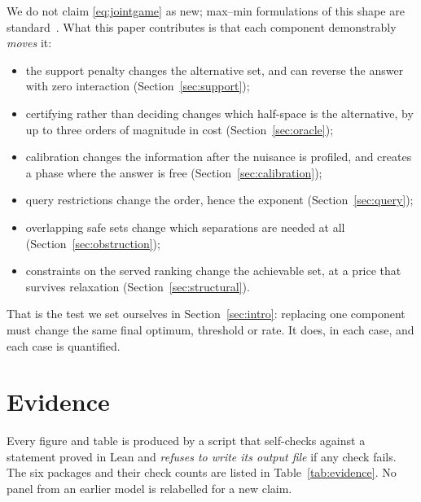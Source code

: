 We do not claim \eqref{eq:jointgame} as new; max--min formulations of this shape are
standard~\cite{degenne2019,nitinawarat2013}. What this paper contributes is that each
component demonstrably \emph{moves} it:
\begin{itemize}
\item the support penalty changes the alternative set, and can reverse the answer with zero
interaction (Section~\ref{sec:support});
\item certifying rather than deciding changes which half-space is the
alternative, by up to three orders of magnitude in cost (Section~\ref{sec:oracle});
\item calibration changes the information after the nuisance is profiled, and creates a
phase where the answer is free (Section~\ref{sec:calibration});
\item query restrictions change the order, hence the exponent (Section~\ref{sec:query});
\item overlapping safe sets change which separations are needed at all
(Section~\ref{sec:obstruction});
\item constraints on the served ranking change the achievable set, at a price that survives
relaxation (Section~\ref{sec:structural}).
\end{itemize}
That is the test we set ourselves in Section~\ref{sec:intro}: replacing one component must
change the same final optimum, threshold or rate. It does, in each case, and each case is
quantified.


\section{Evidence}
\label{sec:evidence}

Every figure and table is produced by a script that self-checks against a statement proved
in Lean and \emph{refuses to write its output file} if any check fails. The six packages
and their check counts are listed in Table~\ref{tab:evidence}. No panel from an earlier
model is relabelled for a new claim.

